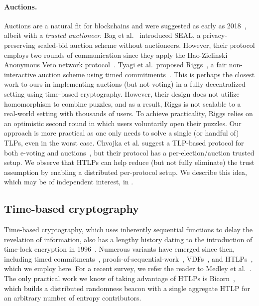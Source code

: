 \paragraph{Auctions.} 
Auctions are a natural fit for blockchains and were suggested as early as 2018~\cite{EPRINT:GalYou18}, albeit with a \emph{trusted auctioneer}. Bag et al.~\cite{TIFS:BHSR19} introduced SEAL, a privacy-preserving sealed-bid auction scheme without auctioneers. However, their protocol employs two rounds of communication since they apply the Hao-Zielinski Anonymous Veto network protocol~\cite{HaoZie06}. Tyagi et al.\ proposed Riggs~\cite{CCS:TAFWBM23}, a fair non-interactive auction scheme using timed commitments~\cite[\S6]{TCC:FKPS21}. This is perhaps the closest work to ours in implementing auctions (but not voting) in a fully decentralized setting using time-based cryptography. However, their design does not utilize homomorphism to combine puzzles, and as a result, Riggs is not scalable to a real-world setting with thousands of users. To achieve practicality, Riggs relies on an optimistic second round in which users voluntarily open their puzzles. %
Our approach is more practical as one only needs to solve a single (or handful of) TLPs, even in the worst case.
Chvojka et al. suggest a TLP-based protocol for both e-voting and auctions~\cite{ESORICS:CJSS21}, but their protocol has a per-election/auction trusted setup. We observe that HTLPs can help reduce (but not fully eliminate) the trust assumption by enabling a distributed per-protocol setup. We describe this idea, which may be of independent interest, in .

\subsection{Time-based cryptography} 
Time-based cryptography, which uses inherently sequential functions to delay the revelation of information, also has a lengthy history dating to the introduction of time-lock encryption in 1996~\cite{RivShaWag96}.
Numerous variants have emerged since then, including timed commitments~\cite{C:BonNao00}, proofs-of-sequential-work~\cite{ITCS:MahMorVad13}, VDFs~\cite{C:BBBF18}, and HTLPs~\cite{C:MalThy19}, which we employ here.
For a recent survey, we refer the reader to Medley et al.~\cite{CSF:MedLoeQua23}. The only practical work we know of taking advantage of HTLPs is Bicorn~\cite{FC:CATB23}, which builds a distributed randomness beacon with a single aggregate HTLP for an arbitrary number of entropy contributors.

